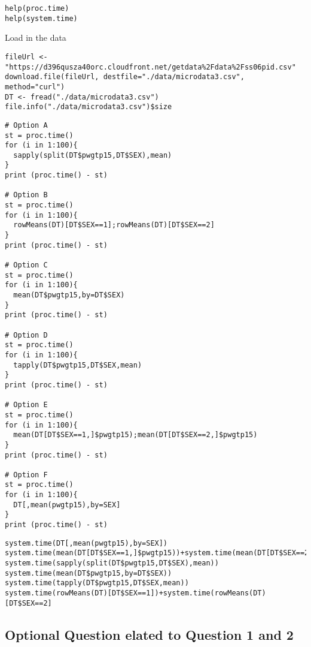 \documentclass[]{article}
\begin{document}
\begin{framed}
\begin{framed}
\begin{verbatim}
help(proc.time)
help(system.time)
\end{verbatim}
\end{framed}
Load in the data
\begin{framed}
\begin{verbatim}
fileUrl <- "https://d396qusza40orc.cloudfront.net/getdata%2Fdata%2Fss06pid.csv"
download.file(fileUrl, destfile="./data/microdata3.csv", method="curl")
DT <- fread("./data/microdata3.csv")
file.info("./data/microdata3.csv")$size
\end{verbatim}
\end{framed}
\newpage
\begin{framed}
\begin{verbatim}
# Option A
st = proc.time()
for (i in 1:100){
  sapply(split(DT$pwgtp15,DT$SEX),mean)
}
print (proc.time() - st)

# Option B
st = proc.time()
for (i in 1:100){
  rowMeans(DT)[DT$SEX==1];rowMeans(DT)[DT$SEX==2]
}
print (proc.time() - st)

# Option C
st = proc.time()
for (i in 1:100){
  mean(DT$pwgtp15,by=DT$SEX)
}
print (proc.time() - st)

# Option D
st = proc.time()
for (i in 1:100){
  tapply(DT$pwgtp15,DT$SEX,mean)
}
print (proc.time() - st)

# Option E
st = proc.time()
for (i in 1:100){
  mean(DT[DT$SEX==1,]$pwgtp15);mean(DT[DT$SEX==2,]$pwgtp15)
}
print (proc.time() - st)

# Option F
st = proc.time()
for (i in 1:100){
  DT[,mean(pwgtp15),by=SEX]
}
print (proc.time() - st)
\end{verbatim}
\end{framed}

\newpage
\begin{framed}
\begin{verbatim}
system.time(DT[,mean(pwgtp15),by=SEX])
system.time(mean(DT[DT$SEX==1,]$pwgtp15))+system.time(mean(DT[DT$SEX==2,]$pwgtp15))
system.time(sapply(split(DT$pwgtp15,DT$SEX),mean))
system.time(mean(DT$pwgtp15,by=DT$SEX))
system.time(tapply(DT$pwgtp15,DT$SEX,mean))
system.time(rowMeans(DT)[DT$SEX==1])+system.time(rowMeans(DT)[DT$SEX==2]
\end{verbatim}
\end{framed}


\newpage
\subsection*{Optional Question elated to Question 1 and 2}


\end{framed}
\end{document}
